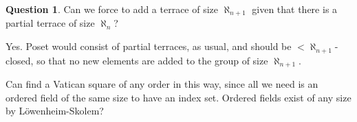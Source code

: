 \documentclass{amsart}
\theoremstyle{definition}
\newtheorem{question}{Question}
\theoremstyle{remark}
\newcommand{\To}{\longrightarrow}
\newcommand{\g}{\textup{\textbf{g}}}
\begin{document}
%

\begin{question} Can we force to add a terrace of size $\aleph_{n+1}$ given that there is a partial terrace of size $\aleph_n$? \end{question}
Yes. Poset would consist of partial terraces, as usual, and should be $<\aleph_{n+1}$-closed, so that no new elements are added to the group of size $\aleph_{n+1}$. 

Can find a Vatican square of any order in this way, since all we need is an ordered field of the same size to have an index set. Ordered fields exist of any size by L\"owenheim-Skolem?




%
\end{document}
